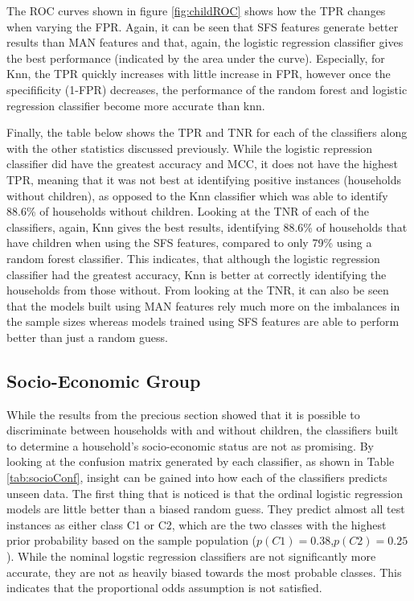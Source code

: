\childROC
The ROC curves shown in figure \ref{fig:childROC} shows how the TPR changes when varying the FPR. Again, it can be seen that SFS features generate better results than MAN features and that, again, the logistic regression classifier gives the best performance (indicated by the area under the curve). Especially, for Knn, the TPR quickly increases with little increase in FPR, however once the specifificity (1-FPR) decreases, the performance of the random forest and logistic regression classifier become more accurate than knn.
\childResults

Finally, the table below shows the TPR and TNR for each of the classifiers along with the other statistics discussed previously. While the logistic repression classifier did have the greatest accuracy and MCC, it does not have the highest TPR, meaning that it was not best at identifying positive instances (households without children), as opposed to the Knn classifier which was able to identify 88.6\% of households without children. Looking at the TNR of each of the classifiers, again, Knn gives the best results, identifying 88.6\% of households that have children when using the SFS features, compared to only 79\% using a random forest classifier. This indicates, that although the logistic regression classifier had the greatest accuracy, Knn is better at correctly identifying the households from those without. From looking at the TNR, it can also be seen that the models built using MAN features rely much more on the imbalances in the sample sizes whereas models trained using SFS features are able to perform better than just a random guess.

\subsection{Socio-Economic Group}


While the results from the precious section showed that it is possible to discriminate between households with and without children, the classifiers built to determine a household's socio-economic status are not as promising.  By looking at the confusion matrix generated by each classifier, as shown in Table \ref{tab:socioConf}, insight can be gained into how each of the classifiers predicts unseen data. The first thing that is noticed is that the ordinal logistic regression models are little better than a biased random guess. They predict almost all test instances as either class C1 or C2, which are the two classes with the highest prior probability based on the sample population ($p(C1)=0.38$,$p(C2)=0.25$). While the nominal logstic regression classifiers are not significantly more accurate, they are not as heavily biased towards the most probable classes. This indicates that the proportional odds assumption is not satisfied. 
\socioConf


